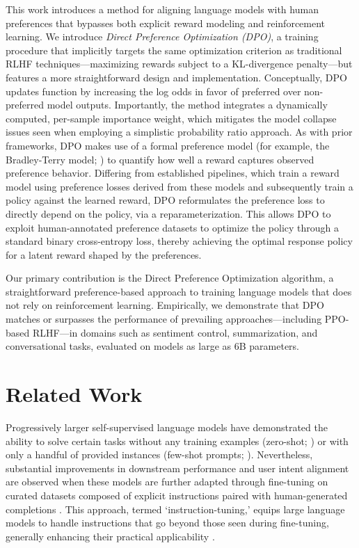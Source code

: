 This work introduces a method for aligning language models with human preferences that bypasses both explicit reward modeling and reinforcement learning. We introduce \textit{{Direct Preference Optimization} (DPO)}, a training procedure that implicitly targets the same optimization criterion as traditional RLHF techniques—maximizing rewards subject to a KL-divergence penalty—but features a more straightforward design and implementation. Conceptually, DPO updates function by increasing the log odds in favor of preferred over non-preferred model outputs. Importantly, the method integrates a dynamically computed, per-sample importance weight, which mitigates the model collapse issues seen when employing a simplistic probability ratio approach. As with prior frameworks, DPO makes use of a formal preference model (for example, the Bradley-Terry model; \cite{bradley1952rankanalysis}) to quantify how well a reward captures observed preference behavior. Differing from established pipelines, which train a reward model using preference losses derived from these models and subsequently train a policy against the learned reward, DPO reformulates the preference loss to directly depend on the policy, via a reparameterization. This allows DPO to exploit human-annotated preference datasets to optimize the policy through a standard binary cross-entropy loss, thereby achieving the optimal response policy for a latent reward shaped by the preferences.

Our primary contribution is the Direct Preference Optimization algorithm, a straightforward preference-based approach to training language models that does not rely on reinforcement learning. Empirically, we demonstrate that DPO matches or surpasses the performance of prevailing approaches—including PPO-based RLHF—in domains such as sentiment control, summarization, and conversational tasks, evaluated on models as large as 6B parameters.

\section{Related Work}

Progressively larger self-supervised language models have demonstrated the ability to solve certain tasks without any training examples (zero-shot; \citep{radford2019language}) or with only a handful of provided instances (few-shot prompts; \citep{gpt3,megatron,chowdhery2022palm}). Nevertheless, substantial improvements in downstream performance and user intent alignment are observed when these models are further adapted through fine-tuning on curated datasets composed of explicit instructions paired with human-generated completions \citep{mishra-etal-2022-cross,sanh2022multitask,chung2022scaling,thoppilan2022lamda}. This approach, termed `instruction-tuning,' equips large language models to handle instructions that go beyond those seen during fine-tuning, generally enhancing their practical applicability \citep{chung2022scaling}. 

